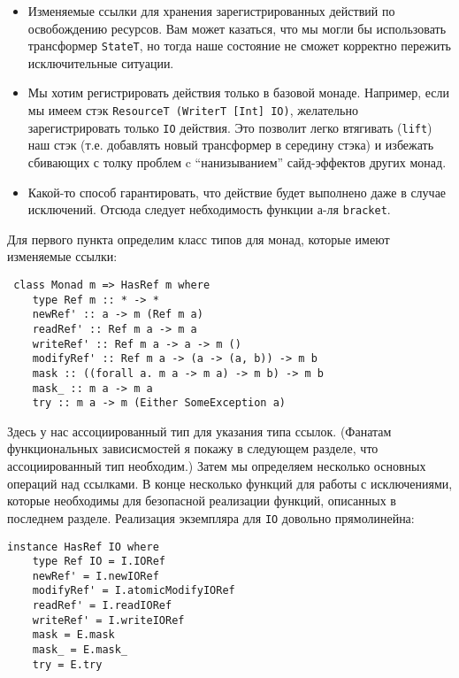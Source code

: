 \begin{itemize}
\item Изменяемые ссылки для хранения зарегистрированных действий по освобождению
ресурсов. Вам может казаться, что мы могли бы использовать трансформер \lstinline'StateT',
но тогда наше состояние не сможет корректно пережить исключительные ситуации.

\item Мы хотим регистрировать действия только в базовой монаде. Например, если мы имеем 
стэк \lstinline'ResourceT (WriterT [Int] IO)', желательно зарегистрировать
только \verb'IO' действия. Это позволит легко втягивать (\verb'lift') наш стэк (т.е. добавлять новый
трансформер в середину стэка) и избежать сбивающих с толку проблем c ``нанизыванием'' сайд-эффектов других монад.


\item Какой-то способ гарантировать, что действие будет выполнено даже в случае
исключений. Отсюда следует небходимость функции а-ля \verb'bracket'.
\end{itemize}

Для первого пункта определим класс типов для монад, которые имеют изменяемые ссылки:
\begin{lstlisting}
 class Monad m => HasRef m where
    type Ref m :: * -> *
    newRef' :: a -> m (Ref m a)
    readRef' :: Ref m a -> m a
    writeRef' :: Ref m a -> a -> m ()
    modifyRef' :: Ref m a -> (a -> (a, b)) -> m b
    mask :: ((forall a. m a -> m a) -> m b) -> m b
    mask_ :: m a -> m a
    try :: m a -> m (Either SomeException a)
\end{lstlisting}

Здесь у нас ассоциированный тип для указания типа ссылок. (Фанатам функциональных 
зависисмостей я покажу в следующем разделе, что ассоциированный тип необходим.) 
Затем мы определяем несколько основных операций над ссылками.
В конце несколько функций для работы с
исключениями, которые необходимы для безопасной реализации функций, описанных в
последнем разделе. Реализация экземпляра для \verb'IO' довольно прямолинейна:
  
\begin{lstlisting}
instance HasRef IO where
    type Ref IO = I.IORef
    newRef' = I.newIORef
    modifyRef' = I.atomicModifyIORef
    readRef' = I.readIORef
    writeRef' = I.writeIORef
    mask = E.mask
    mask_ = E.mask_
    try = E.try 
\end{lstlisting}

